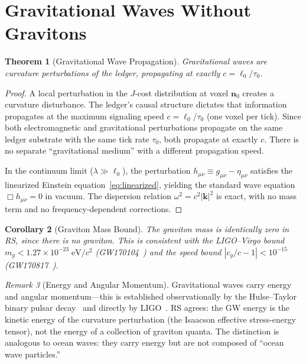 \documentclass[12pt,a4paper]{article}
\newtheorem{theorem}{Theorem}[section]
\newtheorem{corollary}[theorem]{Corollary}
\theoremstyle{definition}
\theoremstyle{remark}
\newtheorem{remark}[theorem]{Remark}
\begin{document}
\section{Gravitational Waves Without Gravitons}
\label{sec:gw}

\begin{theorem}[Gravitational Wave Propagation]
\label{thm:gw}
Gravitational waves are curvature perturbations of the ledger,
propagating at exactly $c = \ell_0/\tau_0$.
\end{theorem}

\begin{proof}
A local perturbation in the $J$-cost distribution at voxel
$\mathbf{n}_0$ creates a curvature disturbance.  The ledger's
causal structure dictates that information propagates at the
maximum signaling speed $c = \ell_0/\tau_0$ (one voxel per tick).
Since both electromagnetic and gravitational perturbations
propagate on the same ledger substrate with the same tick rate
$\tau_0$, both propagate at exactly $c$.  There is no separate
``gravitational medium'' with a different propagation speed.

In the continuum limit ($\lambda \gg \ell_0$), the perturbation
$h_{\mu\nu} \equiv g_{\mu\nu} - \eta_{\mu\nu}$ satisfies the
linearized Einstein equation~\eqref{eq:linearized}, yielding
the standard wave equation
$\Box h_{\mu\nu} = 0$ in vacuum.  The dispersion relation
$\omega^2 = c^2 |\mathbf{k}|^2$ is exact, with no mass term
and no frequency-dependent corrections.
\end{proof}

\begin{corollary}[Graviton Mass Bound]
\label{cor:mass-bound}
The graviton mass is identically zero in RS, since there
is no graviton.  This is consistent with the LIGO--Virgo
bound $m_g < 1.27 \times 10^{-23}\;\mathrm{eV}/c^2$
(GW170104~\cite{LIGO2017mass}) and the speed bound
$|c_g/c - 1| < 10^{-15}$
(GW170817~\cite{GW170817speed}).
\end{corollary}

\begin{remark}[Energy and Angular Momentum]
Gravitational waves carry energy and angular momentum---this is
established observationally by the Hulse--Taylor binary pulsar
decay~\cite{HulseTaylor} and directly by
LIGO~\cite{LIGO2016}.  RS agrees: the GW energy is the kinetic
energy of the curvature perturbation (the Isaacson effective
stress-energy tensor), not the energy of a collection of graviton
quanta.  The distinction is analogous to ocean waves: they carry
energy but are not composed of ``ocean wave particles.''
\end{remark}
\end{document}
